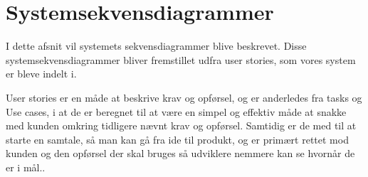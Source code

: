 \section{Systemsekvensdiagrammer}

I dette afsnit vil systemets sekvensdiagrammer blive beskrevet. Disse systemsekvensdiagrammer bliver fremstillet udfra user stories, som vores system er bleve indelt i.    





User stories er en måde at beskrive krav og opførsel, og er anderledes fra tasks og Use cases, i at de er beregnet til at være en simpel og effektiv måde at snakke med kunden omkring tidligere nævnt krav og opførsel. Samtidig er de med til at starte en samtale, så man kan gå fra ide til produkt, og er primært rettet mod kunden og den opførsel der skal bruges så udviklere nemmere kan se hvornår de er i mål..
